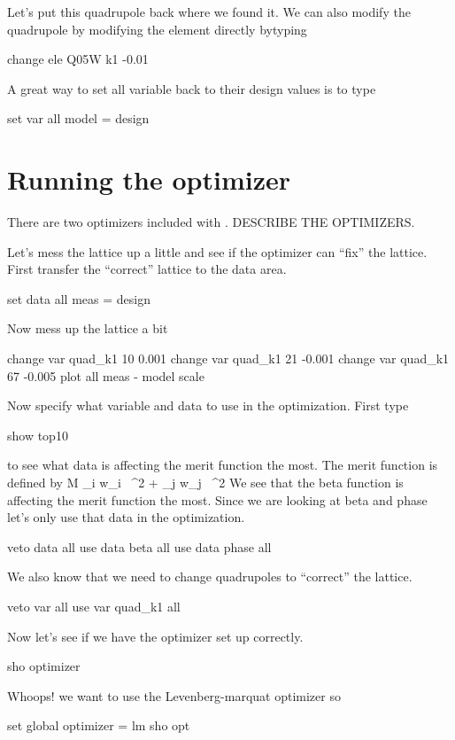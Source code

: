 \documentclass{report}
\begin{document}
Let's put this quadrupole back where we found it. We can also modify the quadrupole
by modifying the element directly bytyping
\begin{example}
  change ele Q05W k1 -0.01
\end{example}

A great way to set all variable back to their design values is to type
\begin{example}
  set var all model = design
\end{example}

\chapter{Running the optimizer}
\label{c:optimizer}

There are two optimizers included with \tao. DESCRIBE THE OPTIMIZERS.

Let's mess the lattice up a little and see if the optimizer can ``fix'' the
lattice. First transfer the ``correct'' lattice to the  data area.
\begin{example}
  set data all meas = design
\end{example}
Now mess up the lattice a bit
\begin{example}
  change var quad\_k1 10 0.001
  change var quad\_k1 21 -0.001
  change var quad\_k1 67 -0.005
  plot all meas - model
  scale
\end{example}

Now specify what variable and data to use in the optimization. First type
\begin{example}
  show top10
\end{example}
to see what data is affecting the merit function the most. The merit function is
defined by
\Begineq
  {\cal M} \equiv \sum\_{i} w\_i \,
    ^2 + 
  \sum\_{j} w\_j \,
    ^2
  \label{m1}
\Endeq
We see that the beta function is affecting the merit function the most. Since we
are looking at beta and phase let's only use that data in the optimization.
\begin{example}
  veto data all
  use  data beta all
  use  data phase all
\end{example}
We also know that we need to change quadrupoles to ``correct'' the lattice.
\begin{example}
  veto var all
  use var quad\_k1 all
\end{example}
Now let's see if we have the optimizer set up correctly.
\begin{example}
  sho optimizer
\end{example}
Whoops! we want to use the Levenberg-marquat optimizer so
\begin{example}
  set global optimizer = lm
  sho opt
\end{example}
\end{document}
